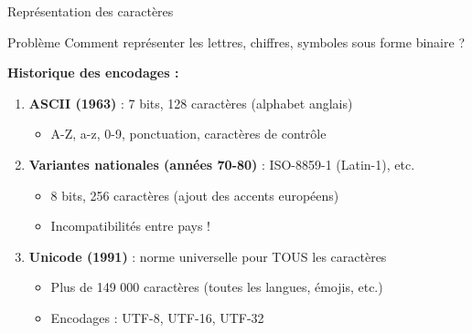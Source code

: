 \documentclass[aspectratio=1610]{beamer}
\begin{document}
\begin{frame}{Représentation des caractères}

  \begin{block}{Problème}
    Comment représenter les lettres, chiffres, symboles sous forme binaire ?
  \end{block}

  \vspace{0.3cm}

  \textbf{Historique des encodages :}

  \begin{enumerate}
    \item \textbf{ASCII (1963)} : 7 bits, 128 caractères (alphabet anglais)
    \begin{itemize}
      \item A-Z, a-z, 0-9, ponctuation, caractères de contrôle
    \end{itemize}

    \pause

    \item \textbf{Variantes nationales (années 70-80)} : ISO-8859-1 (Latin-1), etc.
    \begin{itemize}
      \item 8 bits, 256 caractères (ajout des accents européens)
      \item  Incompatibilités entre pays !
    \end{itemize}

    \pause

    \item \textbf{Unicode (1991)} : norme universelle pour TOUS les caractères
    \begin{itemize}
      \item Plus de 149 000 caractères (toutes les langues, émojis, etc.)
      \item Encodages : UTF-8, UTF-16, UTF-32
    \end{itemize}
  \end{enumerate}

\end{frame}
\end{document}
